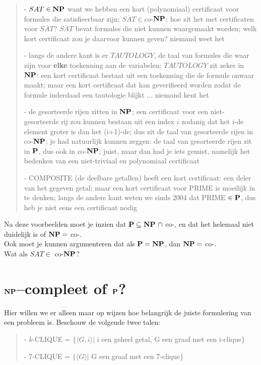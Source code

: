 \begin{verse}
- $SAT \in \NP$ want we hebben een kort (polynomiaal) certificaat voor
formules die satisfieerbaar zijn; $\overline{SAT} \in co$-$\NP$; hoe
zit het met certificaten voor $\overline{SAT}$? $\overline{SAT}$ bevat
formules die niet kunnen waargemaakt worden; welk kort certificaat zou
je daarvoor kunnen geven? niemand weet het

- langs de andere kant is er $TAUTOLOGY$, de taal van formules die
waar zijn voor {\bf elke} toekenning aan de variabelen;
$\overline{TAUTOLOGY}$ zit zeker in $\NP$: een kort certificaat bestaat
uit een toekenning die de formule onwaar maakt; maar een kort
certificaat dat kan geverifieerd worden zodat de formule inderdaad een
tautologie blijkt ... niemand kent het

- de gesorteerde rijen zitten in $\NP$; een certificaat voor een
niet-gesorteerde rij zou kunnen bestaan uit een index $i$ zodanig dat
het i-de element groter is dan het (i+1)-de; dus zit de taal van
gesorteerde rijen in co-$\NP$; je had natuurlijk kunnen zeggen: de taal
van gesorteerde rijen zit in $\P$, dus ook in co-$\NP$; juist, maar dan
had je iets gemist, namelijk het bedenken van een niet-triviaal en
polynomiaal certificaat

- COMPOSITE (de deelbare getallen) heeft een kort certificaat: een
deler van het gegeven getal; maar een kort certificaat voor PRIME is
moeilijk in te denken; langs de andere kant weten we sinds 2004 dat
PRIME $\in \P$, dus heb je niet eens een certificaat nodig
\end{verse}

Na deze voorbeelden moet je inzien dat $\P \subseteq \NP ~\cap$
co-\NP, en dat het helemaal niet duidelijk is of $\NP = $ co-\NP. \\
Ook moet je kunnen argumenteren dat als $\P = \NP$, dan $\NP = $
co-\NP. \\ Wat als $SAT \in$ co-$\NP$?

\section{$\NP$--compleet of $\P$?}

Hier willen we er alleen maar op wijzen hoe belangrijk de juiste
formulering van een probleem is. Beschouw de volgende twee talen:

\begin{verse}
- $k$-CLIQUE = $\{\langle G,i \rangle|$ i een geheel getal, G een graaf met een i-clique$\}$

- 7-CLIQUE = $\{\langle G \rangle|$ G een graaf met een 7-clique$\}$
\end{verse}


